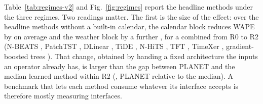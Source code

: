 Table~\ref{tab:regimes-v2} and Fig.~\ref{fig:regimes} report the headline methods under the
three regimes. Two readings matter. The first is the size of the effect: over the headline
methods without a built-in calendar, the calendar block reduces WAPE by
 on average and the weather block by a further
, for a combined 
from R0 to R2 (N-BEATS , PatchTST
, DLinear
, TiDE ,
N-HiTS , TFT
, TimeXer ,
gradient-boosted trees ). That change, obtained by
handing a fixed architecture the inputs an operator already has, is larger than the gap between
PLANET and the median learned method within R2 (, PLANET relative
to the median). A benchmark that lets each method consume whatever its interface accepts is
therefore mostly measuring interfaces.

